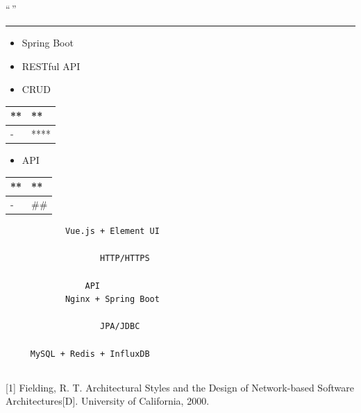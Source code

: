 \subsection{}\label{section-7}

``\,''

\begin{center}\rule{0.5\linewidth}{0.5pt}\end{center}

\begin{itemize}
\tightlist
\item
  Spring Boot
\item
  RESTful API
\item
  CRUD
\end{itemize}

\begin{longtable}[]{@{}ll@{}}
\toprule\noalign{}
** & ** \\
\midrule\noalign{}
\endhead
\bottomrule\noalign{}
\endlastfoot
- & **** \\
\end{longtable}

\begin{itemize}
\tightlist
\item
  API
\end{itemize}

\begin{longtable}[]{@{}ll@{}}
\toprule\noalign{}
** & ** \\
\midrule\noalign{}
\endhead
\bottomrule\noalign{}
\endlastfoot
- & \#\# \\
\end{longtable}

\begin{verbatim}
            Vue.js + Element UI                

                   HTTP/HTTPS

                API                        
            Nginx + Spring Boot                

                   JPA/JDBC

     MySQL + Redis + InfluxDB       
\end{verbatim}

\subsection{}\label{section-8}

{[}1{]} Fielding, R. T. Architectural Styles and the Design of
Network-based Software Architectures{[}D{]}. University of California,
2000.

